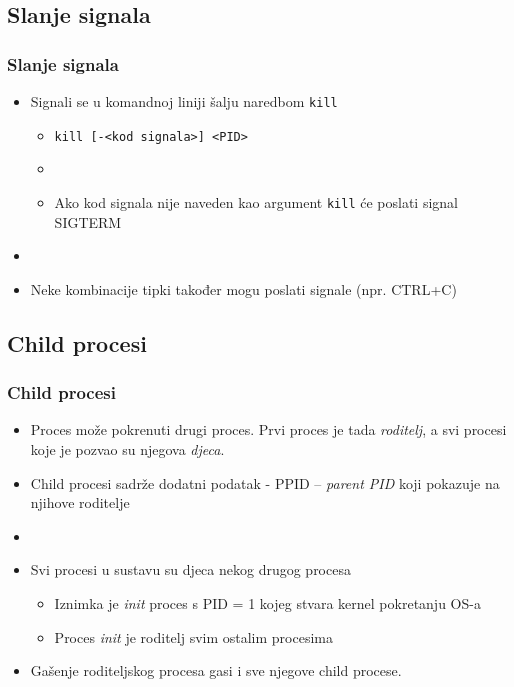 \documentclass[table,usenames,dvipsnames]{beamer}
\newcommand{\shell}[1]{\texttt{#1}}
\begin{document}
\subsection{Slanje signala}
\begin{frame}[t]
	\frametitle{Slanje signala}
	\begin{itemize}
		\item Signali se u komandnoj liniji šalju naredbom \shell{kill}
		\begin{itemize}
			\item[] \shell{kill [-<kod signala>] <PID>}
			\item[]
			\item Ako kod signala nije naveden kao argument \shell{kill} će poslati signal SIGTERM
		\end{itemize}
		
		\item[]
		\item Neke kombinacije tipki također mogu poslati signale (npr. CTRL+C)
	\end{itemize}
\end{frame}


\subsection{Child procesi}
\begin{frame}[t]
	\frametitle{Child procesi}
	\begin{itemize}
		\item Proces može pokrenuti drugi proces. Prvi proces je tada \emph{roditelj}, a svi procesi koje je pozvao su njegova \emph{djeca}.
		\item Child procesi sadrže dodatni podatak - PPID – \emph{parent PID} koji pokazuje na njihove roditelje
	  	\item[]
	  	\item Svi procesi u sustavu su djeca nekog drugog procesa
		  	\begin{itemize}
		  		\item Iznimka je \emph{init} proces s PID = 1 kojeg stvara kernel pokretanju OS-a
		  		\item Proces \emph{init} je roditelj svim ostalim procesima
		  	\end{itemize}
		\item Gašenje roditeljskog procesa gasi i sve njegove child procese.
	\end{itemize}
\end{frame}
\end{document}
